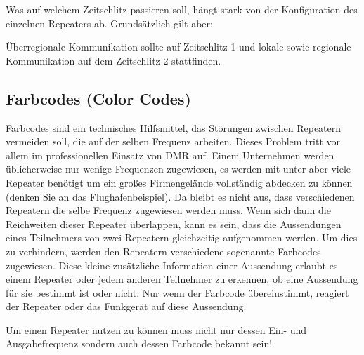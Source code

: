 Was auf welchem Zeitschlitz passieren soll, hängt stark von der Konfiguration des einzelnen Repeaters ab. Grundsätzlich gilt aber:
\begin{merke}
 Überregionale Kommunikation sollte auf Zeitschlitz 1 und lokale sowie regionale Kommunikation auf dem Zeitschlitz 2 stattfinden.
\end{merke} 

\subsection{Farbcodes (Color Codes)} \label{sec:colorcode} 
Farbcodes sind ein technisches Hilfsmittel, das Störungen zwischen Repeatern vermeiden soll, die auf der selben Frequenz arbeiten. Dieses Problem tritt vor allem im professionellen Einsatz von DMR auf. Einem Unternehmen werden üblicherweise nur wenige Frequenzen zugewiesen, es werden mit unter aber viele Repeater benötigt um ein großes Firmengelände vollständig abdecken zu können (denken Sie an das Flughafenbeispiel). Da bleibt es nicht aus, dass verschiedenen Repeatern die selbe Frequenz zugewiesen werden muss. Wenn sich dann die Reichweiten dieser Repeater überlappen, kann es sein, dass die Aussendungen eines Teilnehmers von zwei Repeatern gleichzeitig aufgenommen werden. Um dies zu verhindern, werden den Repeatern verschiedene sogenannte Farbcodes zugewiesen. Diese kleine zusätzliche Information einer Aussendung erlaubt es einem Repeater oder jedem anderen Teilnehmer zu erkennen, ob eine Aussendung für sie bestimmt ist oder nicht. Nur wenn der Farbcode übereinstimmt, reagiert der Repeater oder das Funkgerät auf diese Aussendung. 

\begin{merke}
 Um einen Repeater nutzen zu können muss nicht nur dessen Ein- und Ausgabefrequenz sondern auch dessen Farbcode bekannt sein!
\end{merke}
